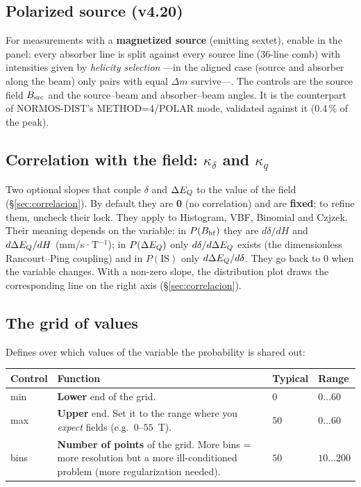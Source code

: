 \subsection{Polarized source (v4.20)}
\label{sec:fuente-polarizada}

For measurements with a \textbf{magnetized source} (emitting sextet),
enable  in the panel: every absorber line is split
against every source line (36-line comb) with intensities given by
\emph{helicity selection} —in the aligned case (source and absorber along
the beam) only pairs with equal $\Delta m$ survive—. The controls are the
source field $B_{\rm src}$ and the source--beam and absorber--beam angles.
It is the counterpart of NORMOS-DIST's METHOD=4/POLAR mode, validated
against it (0.4\,\% of the peak).

\subsection{Correlation with the field: $\kappa_\delta$ and $\kappa_q$}

Two optional slopes that couple $\delta$ and $\Delta E_{Q}$ to the value of the field
(\S\ref{sec:correlacion}). By default they are \textbf{0} (no correlation) and are
\textbf{fixed}; to refine them, uncheck their lock. They apply to Histogram, VBF,
Binomial and Czjzek. Their meaning depends on the variable: in $P(B_{\mathrm{hf}})$ they are
$d\delta/dH$ and $d\Delta E_{Q}/dH$ (mm/s·T$^{-1}$); in $P(\Delta E_{Q})$ only $d\delta/d\Delta E_{Q}$
exists (the dimensionless Rancourt--Ping coupling) and in $P(\text{IS})$ only
$d\Delta E_{Q}/d\delta$. They go back to 0 when the variable changes. With a non-zero
slope, the distribution plot draws the corresponding line on the right axis
(\S\ref{sec:correlacion}).

\subsection{The grid of values}

Defines over which values of the variable the probability is shared out:

\begin{center}
\begin{tabular}{@{}lp{}ll@{}}
\toprule
\textbf{Control} & \textbf{Function} & \textbf{Typical} & \textbf{Range} \\
\midrule
min & \textbf{Lower} end of the grid. & $0$ & $0\ldots60$ \\[3pt]
max & \textbf{Upper} end. Set it to the range where you \emph{expect} fields (e.g.\
$0$--$55$~T). & $50$ & $0\ldots60$ \\[3pt]
bins & \textbf{Number of points} of the grid. More bins = more resolution but a
more ill-conditioned problem (more regularization needed). & $50$ & $10\ldots200$ \\
\bottomrule
\end{tabular}
\end{center}

